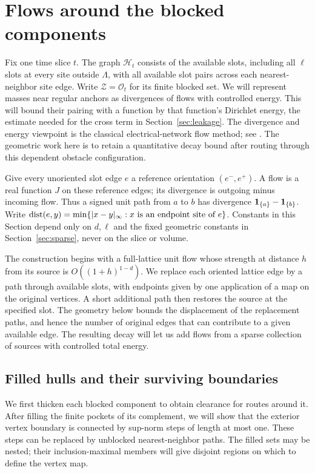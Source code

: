 \section{Flows around the blocked components}\label{sec:flows}

Fix one time slice $t$.  The graph $\mathcal H_t$ consists of the available slots, including
all $\ell$ slots at every site outside $\Lambda$, with all available slot
pairs across each nearest-neighbor site edge.  Write $\mathcal Z=\mathcal O_t$
for its finite blocked set.  We will represent masses near regular anchors as divergences
of flows with controlled energy.  This will bound their pairing with a
function by that function's Dirichlet energy, the estimate needed for the
cross term in Section~\ref{sec:leakage}.
The divergence and energy viewpoint is the classical electrical-network
flow method; see \cite[Sections~1.3.5 and~2.4.6]{DoyleSnell1984}.
The geometric work here is to retain a quantitative decay bound after
routing through this dependent obstacle configuration.

Give every unoriented slot edge $e$ a reference orientation $(e^-,e^+)$.
A flow is a real function $J$ on these reference edges; its divergence is
outgoing minus incoming flow.  Thus a signed unit path from $a$ to $b$
has divergence $\mathbf 1_{\{a\}}-\mathbf 1_{\{b\}}$.  Write
$\operatorname{dist}(e,y)=\min\{|x-y|_\infty:x\text{ is an endpoint site of }e\}$.
Constants in this Section depend only on $d,\ell$ and the fixed geometric
constants in Section~\ref{sec:sparse}, never on the slice or volume.

The construction begins with a full-lattice unit flow whose strength at
distance $h$ from its source is $O((1+h)^{1-d})$.  We replace each oriented
lattice edge by a path through available slots, with endpoints given by
one application of a map on the original vertices.  A short additional
path then restores the source at the specified slot.  The geometry below
bounds the displacement of the replacement paths, and hence the number
of original edges that can contribute to a given available edge.
The resulting decay will let us add flows from a sparse collection of
sources with controlled total energy.

\subsection{Filled hulls and their surviving boundaries}

We first thicken each blocked component to obtain clearance for routes
around it.  After filling the finite pockets of its complement, we will
show that the exterior vertex boundary is connected by sup-norm steps of
length at most one.  These steps can be replaced by unblocked
nearest-neighbor paths.  The filled sets may be nested; their
inclusion-maximal members will give disjoint regions on which to define
the vertex map.

